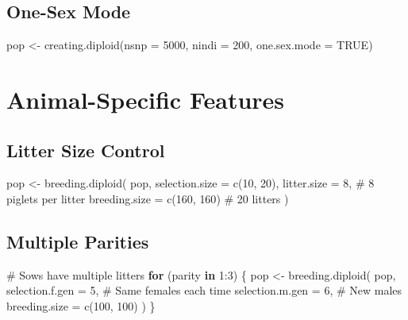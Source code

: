 \documentclass[
  letterpaper,
]{book}
\newenvironment{Shaded}{\begin{snugshade}}{\end{snugshade}}
\newcommand{\AttributeTok}[1]{\textcolor[rgb]{0.40,0.45,0.13}{#1}}
\newcommand{\CommentTok}[1]{\textcolor[rgb]{0.37,0.37,0.37}{#1}}
\newcommand{\ConstantTok}[1]{\textcolor[rgb]{0.56,0.35,0.01}{#1}}
\newcommand{\ControlFlowTok}[1]{\textcolor[rgb]{0.00,0.23,0.31}{\textbf{#1}}}
\newcommand{\DecValTok}[1]{\textcolor[rgb]{0.68,0.00,0.00}{#1}}
\newcommand{\FunctionTok}[1]{\textcolor[rgb]{0.28,0.35,0.67}{#1}}
\newcommand{\NormalTok}[1]{\textcolor[rgb]{0.00,0.23,0.31}{#1}}
\newcommand{\OtherTok}[1]{\textcolor[rgb]{0.00,0.23,0.31}{#1}}
\newcommand{\SpecialCharTok}[1]{\textcolor[rgb]{0.37,0.37,0.37}{#1}}
\begin{document}
\subsection{One-Sex Mode}\label{one-sex-mode-2}

\begin{Shaded}
\begin{Highlighting}[]
\NormalTok{pop }\OtherTok{\textless{}{-}} \FunctionTok{creating.diploid}\NormalTok{(}\AttributeTok{nsnp =} \DecValTok{5000}\NormalTok{, }\AttributeTok{nindi =} \DecValTok{200}\NormalTok{, }\AttributeTok{one.sex.mode =} \ConstantTok{TRUE}\NormalTok{)}
\end{Highlighting}
\end{Shaded}

\section{Animal-Specific Features}\label{animal-specific-features}

\subsection{Litter Size Control}\label{litter-size-control}

\begin{Shaded}
\begin{Highlighting}[]
\NormalTok{pop }\OtherTok{\textless{}{-}} \FunctionTok{breeding.diploid}\NormalTok{(}
\NormalTok{  pop,}
  \AttributeTok{selection.size =} \FunctionTok{c}\NormalTok{(}\DecValTok{10}\NormalTok{, }\DecValTok{20}\NormalTok{),}
  \AttributeTok{litter.size =} \DecValTok{8}\NormalTok{,              }\CommentTok{\# 8 piglets per litter}
  \AttributeTok{breeding.size =} \FunctionTok{c}\NormalTok{(}\DecValTok{160}\NormalTok{, }\DecValTok{160}\NormalTok{)   }\CommentTok{\# 20 litters}
\NormalTok{)}
\end{Highlighting}
\end{Shaded}

\subsection{Multiple Parities}\label{multiple-parities}

\begin{Shaded}
\begin{Highlighting}[]
\CommentTok{\# Sows have multiple litters}
\ControlFlowTok{for}\NormalTok{ (parity }\ControlFlowTok{in} \DecValTok{1}\SpecialCharTok{:}\DecValTok{3}\NormalTok{) \{}
\NormalTok{  pop }\OtherTok{\textless{}{-}} \FunctionTok{breeding.diploid}\NormalTok{(}
\NormalTok{    pop,}
    \AttributeTok{selection.f.gen =} \DecValTok{5}\NormalTok{,        }\CommentTok{\# Same females each time}
    \AttributeTok{selection.m.gen =} \DecValTok{6}\NormalTok{,        }\CommentTok{\# New males}
    \AttributeTok{breeding.size =} \FunctionTok{c}\NormalTok{(}\DecValTok{100}\NormalTok{, }\DecValTok{100}\NormalTok{)}
\NormalTok{  )}
\NormalTok{\}}
\end{Highlighting}
\end{Shaded}
\end{document}
